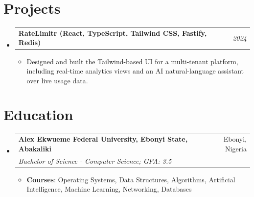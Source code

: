 \documentclass[a4paper]{article}
\makeatletter
\newcommand{\resumeItem}[2]{ \item\small{ \textbf{#1}: #2 } }
\newcommand{\resumeSubheading}[4]{
\vspace{-1pt}
\item[]
\begin{tabular*}{0.97\textwidth}{l@{\extracolsep{\fill}}r}
	\textbf{#1} & #2          \\
	\textit{#3} & \textit{#4} \\
\end{tabular*}
\vspace{1pt}
}
\newcommand{\resumeProjectHeading}[2]{ %
\vspace{2pt}
\item[]
\begin{tabular*}{0.97\textwidth}{l@{\extracolsep{\fill}}r}
	\textbf{#1} & \textit{#2} \\
\end{tabular*}
\vspace{0pt}
}
\newcommand{\resumeSubHeadingListStart}{\begin{itemize}[leftmargin=*,topsep=1pt]}
\newcommand{\resumeSubHeadingListEnd}{\end{itemize}}
\newcommand{\resumeItemListStart}{\begin{itemize}[topsep=0pt,itemsep=0pt,parsep=0pt]}
\newcommand{\resumeItemListEnd}{\end{itemize}}
\makeatother
\begin{document}
	\section{Projects}
	\resumeSubHeadingListStart
	\resumeProjectHeading{RateLimitr (React, TypeScript, Tailwind CSS, Fastify, Redis)}{2024}
	\resumeItemListStart
	\item\small{Designed and built the Tailwind-based UI for a multi-tenant platform, including real-time analytics views and an AI natural-language assistant over live usage data.}
	\resumeItemListEnd
	\resumeSubHeadingListEnd

	\section{Education}
	\resumeSubHeadingListStart
	\resumeSubheading
	{Alex Ekwueme Federal University, Ebonyi State, Abakaliki}{Ebonyi, Nigeria}
	{Bachelor of Science - Computer Science; GPA: 3.5}{}
	\resumeItemListStart
	\resumeItem{Courses}{Operating Systems, Data Structures, Algorithms, Artificial Intelligence, Machine Learning, Networking, Databases}
	\resumeItemListEnd
	\resumeSubHeadingListEnd
\end{document}
